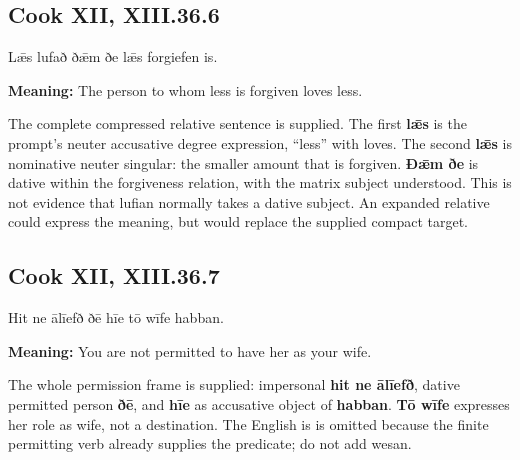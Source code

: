 \par\begin{minipage}{\linewidth}\raggedright
\subsection*{Cook XII, XIII.36.6}

Lǣs lufað ðǣm ðe lǣs forgiefen is.

\textbf{Meaning:} The person to whom less is forgiven loves less.

The complete compressed relative sentence is supplied. The first \textbf{lǣs} is the prompt’s neuter accusative degree expression, “less” with loves. The second \textbf{lǣs} is nominative neuter singular: the smaller amount that is forgiven. \textbf{Ðǣm ðe} is dative within the forgiveness relation, with the matrix subject understood. This is not evidence that lufian normally takes a dative subject. An expanded relative could express the meaning, but would replace the supplied compact target.

\end{minipage}\par\addvspace{4pt}

\par\begin{minipage}{\linewidth}\raggedright
\subsection*{Cook XII, XIII.36.7}

Hit ne ālīefð ðē hīe tō wīfe habban.

\textbf{Meaning:} You are not permitted to have her as your wife.

The whole permission frame is supplied: impersonal \textbf{hit ne ālīefð}, dative permitted person \textbf{ðē}, and \textbf{hīe} as accusative object of \textbf{habban}. \textbf{Tō wīfe} expresses her role as wife, not a destination. The English is is omitted because the finite permitting verb already supplies the predicate; do not add wesan.

\end{minipage}\par\addvspace{4pt}

